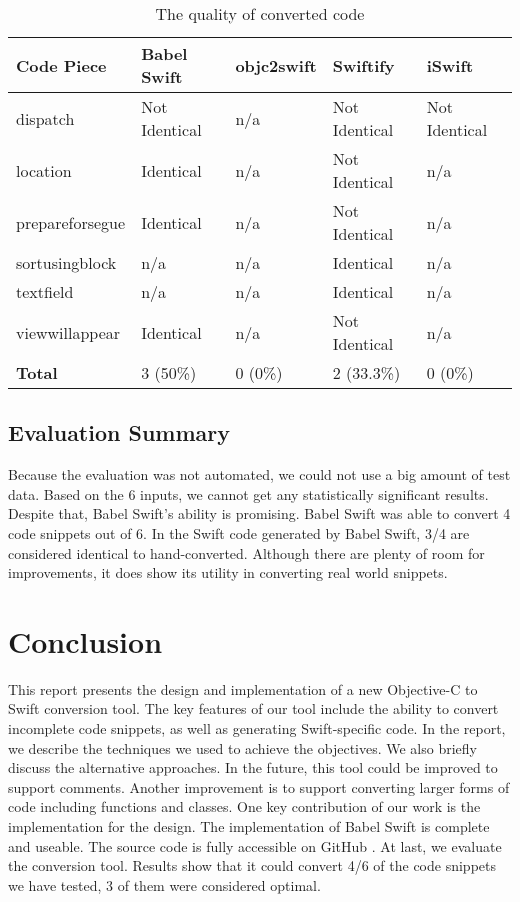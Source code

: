 \documentclass{sfuthesis}
\begin{document}
\begin{table}[H]
\begin{center}
\caption{The quality of converted code}
\begin{tabular}{|l|l|l|l|l|}
\hline
\textbf{Code Piece} & Babel Swift & objc2swift & Swiftify & iSwift \\
\hline
dispatch        & Not Identical & n/a & Not Identical & Not Identical  \\
location        & Identical     & n/a & Not Identical & n/a            \\
prepareforsegue & Identical     & n/a & Not Identical & n/a            \\
sortusingblock  & n/a           & n/a & Identical     & n/a            \\
textfield       & n/a           & n/a & Identical     & n/a            \\
viewwillappear  & Identical     & n/a & Not Identical & n/a            \\
\hline
\textbf{Total}  & 3 (50\%) & 0 (0\%) & 2 (33.3\%) & 0 (0\%) \\
\hline
\end{tabular}
\end{center}
\label{table:quality}
\end{table}

\section{Evaluation Summary}

Because the evaluation was not automated, we could not use a big amount of test data. Based on the 6 inputs, we cannot get any statistically significant results. Despite that, Babel Swift's ability is promising. Babel Swift was able to convert 4 code snippets out of 6. In the Swift code generated by Babel Swift, 3/4 are considered identical to hand-converted. Although there are plenty of room for improvements, it does show its utility in converting real world snippets.

\chapter{Conclusion}

This report presents the design and implementation of a new Objective-C to Swift conversion tool. The key features of our tool include the ability to convert incomplete code snippets, as well as generating Swift-specific code. In the report, we describe the techniques we used to achieve the objectives. We also briefly discuss the alternative approaches. In the future, this tool could be improved to support comments. Another improvement is to support converting larger forms of code including functions and classes.
One key contribution of our work is the implementation for the design. The implementation of Babel Swift is complete and useable. The source code is fully accessible on GitHub \cite{babelswift}. At last, we evaluate the conversion tool. Results show that it could convert 4/6 of the code snippets we have tested, 3 of them were considered optimal.
\end{document}
